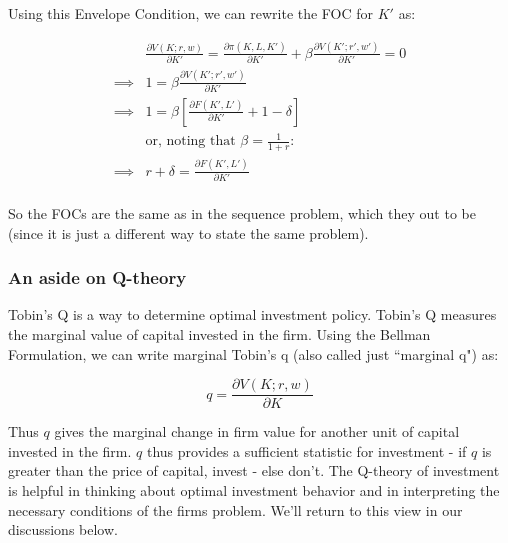 \documentclass[letterpaper,12pt]{article}
\theoremstyle{definition}
\begin{document}
\begin{spacing}{1.5}
Using this Envelope Condition, we can rewrite the FOC for $K'$ as:

\begin{equation}
\label{eqn:bellman_foc_k2}
\begin{split}
&\frac{\partial V(K;r,w)}{\partial K'} = \frac{\partial \pi(K,L,K')}{\partial K'} + \beta \frac{\partial V(K'; r',w')}{\partial K'} = 0 \\
\implies & 1 = \beta \frac{\partial V(K';r',w')}{\partial K'}  \\
\implies & 1 = \beta \left[ \frac{\partial F(K',L')}{\partial K'} + 1 - \delta \right] \\
& \text{or, noting that } \beta = \frac{1}{1+r}: \\
\implies & r+\delta = \frac{\partial F(K',L')}{\partial K'}  \\
\end{split}
\end{equation}

So the FOCs are the same as in the sequence problem, which they out to be (since it is just a different way to state the same problem).

\subsubsection*{An aside on Q-theory}

Tobin's Q is a way to determine optimal investment policy.  Tobin's Q measures the marginal value of capital invested in the firm.  Using the Bellman Formulation, we can write marginal Tobin's q (also called just ``marginal q") as:

\begin{equation}
\label{eqn:marginal_q}
q = \frac{\partial V(K;r,w)}{\partial K}
\end{equation}

Thus $q$ gives the marginal change in firm value for another unit of capital invested in the firm.  $q$ thus provides a sufficient statistic for investment - if $q$ is greater than the price of capital, invest - else don't.  The Q-theory of investment is helpful in thinking about optimal investment behavior and in interpreting the necessary conditions of the firms problem.  We'll return to this view in our discussions below.

%
%
%



\end{spacing}
\end{document}
